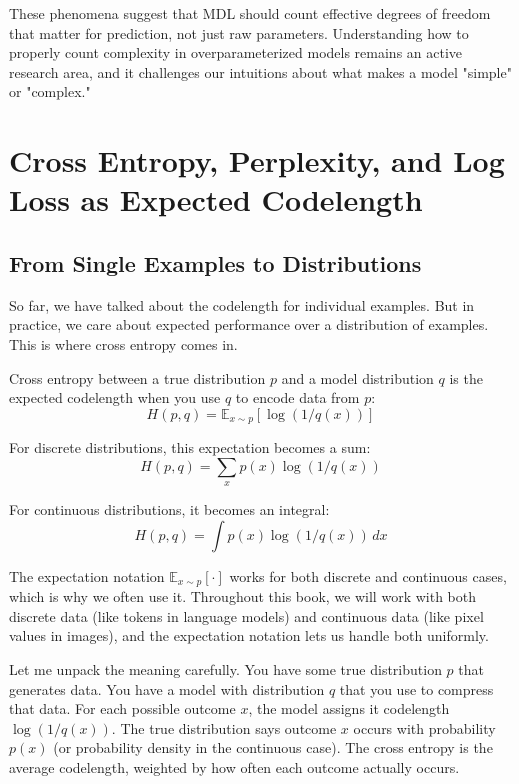 These phenomena suggest that MDL should count effective degrees of freedom that matter for prediction, not just raw parameters. Understanding how to properly count complexity in overparameterized models remains an active research area, and it challenges our intuitions about what makes a model "simple" or "complex."

\vspace{2em}

\section{Cross Entropy, Perplexity, and Log Loss as Expected Codelength}

\subsection{From Single Examples to Distributions}

So far, we have talked about the codelength for individual examples. But in practice, we care about expected performance over a distribution of examples. This is where cross entropy comes in.

Cross entropy between a true distribution $p$ and a model distribution $q$ is the expected codelength when you use $q$ to encode data from $p$:
\begin{equation}
H(p, q) = \mathbb{E}_{x \sim p}\left[\log(1/q(x))\right]
\end{equation}

For discrete distributions, this expectation becomes a sum:
\begin{equation}
H(p, q) = \sum_{x} p(x) \log(1/q(x))
\end{equation}

For continuous distributions, it becomes an integral:
\begin{equation}
H(p, q) = \int p(x) \log(1/q(x)) \, dx
\end{equation}

The expectation notation $\mathbb{E}_{x \sim p}[\cdot]$ works for both discrete and continuous cases, which is why we often use it. Throughout this book, we will work with both discrete data (like tokens in language models) and continuous data (like pixel values in images), and the expectation notation lets us handle both uniformly.

Let me unpack the meaning carefully. You have some true distribution $p$ that generates data. You have a model with distribution $q$ that you use to compress that data. For each possible outcome $x$, the model assigns it codelength $\log(1/q(x))$. The true distribution says outcome $x$ occurs with probability $p(x)$ (or probability density in the continuous case). The cross entropy is the average codelength, weighted by how often each outcome actually occurs.

